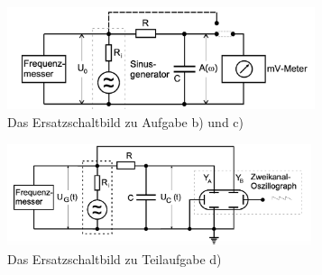 \begin{figure}
    \centering
    \includegraphics[height=3cm]{content/esb2.png}
    \caption{Das Ersatzschaltbild zu Aufgabe b) und c)}
\end{figure}

\begin{figure}
    \centering
    \includegraphics[height=3cm]{content/esb3.png}
    \caption{Das Ersatzschaltbild zu Teilaufgabe d)}
\end{figure}